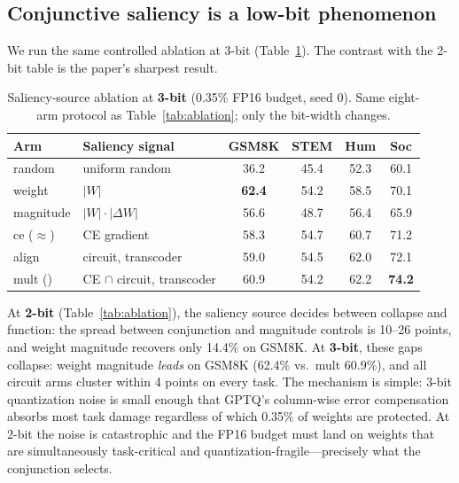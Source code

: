 \subsection{Conjunctive saliency is a low-bit phenomenon}
\label{sec:results-3bit}

We run the same controlled ablation at 3-bit (Table~\ref{tab:ablation3b}).
The contrast with the 2-bit table is the paper's sharpest result.

\begin{table}[t]
\centering
\caption{Saliency-source ablation at \textbf{3-bit} (0.35\% FP16 budget,
seed 0). Same eight-arm protocol as Table~\ref{tab:ablation}; only the
bit-width changes.}
\label{tab:ablation3b}
\small
\begin{tabular}{llcccc}
\toprule
Arm & Saliency signal & GSM8K & STEM & Hum & Soc \\
\midrule
random    & uniform random        & 36.2 & 45.4 & 52.3 & 60.1 \\
weight    & $|W|$                 & \textbf{62.4} & 54.2 & 58.5 & 70.1 \\
magnitude & $|W| \cdot |\Delta W|$& 56.6 & 48.7 & 56.4 & 65.9 \\
\midrule
ce ($\approx$\baseline{}) & CE gradient  & 58.3 & 54.7 & 60.7 & 71.2 \\
align     & circuit, transcoder   & 59.0 & 54.5 & 62.0 & 72.1 \\
mult (\method{}) & CE $\cap$ circuit, transcoder & 60.9 & 54.2 & 62.2 & \textbf{74.2} \\
\bottomrule
\end{tabular}
\end{table}

At \textbf{2-bit} (Table~\ref{tab:ablation}), the saliency source decides
between collapse and function: the spread between conjunction and magnitude
controls is 10--26 points, and weight magnitude recovers only 14.4\% on GSM8K.
At \textbf{3-bit}, these gaps collapse: weight magnitude \emph{leads} on GSM8K
(62.4\% vs.\ mult 60.9\%), and all circuit arms cluster within 4 points on
every task. The mechanism is simple: 3-bit quantization noise is small enough
that GPTQ's column-wise error compensation absorbs most task damage regardless
of which 0.35\% of weights are protected. At 2-bit the noise is catastrophic
and the FP16 budget must land on weights that are simultaneously task-critical
and quantization-fragile---precisely what the conjunction selects.

